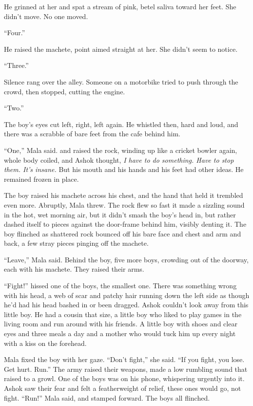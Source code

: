He grinned at her and spat a stream of pink, betel saliva toward
her feet. She didn't move. No one moved.

``Four.''

He raised the machete, point aimed straight at her. She didn't seem
to notice.

``Three.''

Silence rang over the alley. Someone on a motorbike tried to push
through the crowd, then stopped, cutting the engine.

``Two.''

The boy's eyes cut left, right, left again. He whistled then, hard
and loud, and there was a scrabble of bare feet from the cafe
behind him.

``One,'' Mala said. and raised the rock, winding up like a cricket
bowler again, whole body coiled, and Ashok thought,
\emph{I have to do something. Have to stop them. It's insane.} But
his mouth and his hands and his feet had other ideas. He remained
frozen in place.

The boy raised his machete across his chest, and the hand that held
it trembled even more. Abruptly, Mala threw. The rock flew so fast
it made a sizzling sound in the hot, wet morning air, but it didn't
smash the boy's head in, but rather dashed itself to pieces against
the door-frame behind him, visibly denting it. The boy flinched as
shattered rock bounced off his bare face and chest and arm and
back, a few stray pieces pinging off the machete.

``Leave,'' Mala said. Behind the boy, five more boys, crowding out of
the doorway, each with his machete. They raised their arms.

``Fight!'' hissed one of the boys, the smallest one. There was
something wrong with his head, a web of scar and patchy hair
running down the left side as though he'd had his head bashed in or
been dragged. Ashok couldn't look away from this little boy. He had
a cousin that size, a little boy who liked to play games in the
living room and run around with his friends. A little boy with
shoes and clear eyes and three meals a day and a mother who would
tuck him up every night with a kiss on the forehead.

Mala fixed the boy with her gaze. ``Don't fight,'' she said. ``If you
fight, you lose. Get hurt. Run.'' The army raised their weapons,
made a low rumbling sound that raised to a growl. One of the boys
was on his phone, whispering urgently into it. Ashok saw their fear
and felt a featherweight of relief, these ones would go, not fight.
``Run!'' Mala said, and stamped forward. The boys all flinched.

